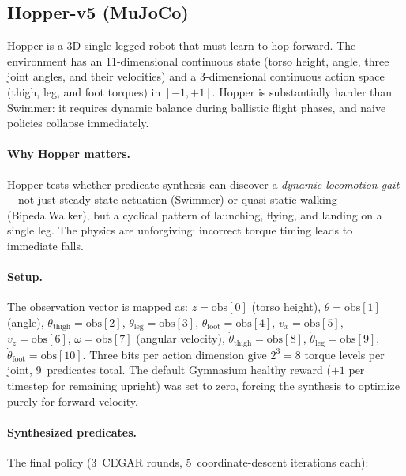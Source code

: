 \documentclass[9pt,a4paper]{article}
\theoremstyle{plain}
\theoremstyle{definition}
\theoremstyle{remark}
\begin{document}
\subsection{Hopper-v5 (MuJoCo)}

Hopper is a 3D single-legged robot that must learn to hop forward.
The environment has an 11-dimensional continuous state
(torso height, angle, three joint angles, and their velocities) and
a 3-dimensional continuous action space (thigh, leg, and foot torques)
in $[-1, +1]$.  Hopper is substantially harder than Swimmer: it
requires dynamic balance during ballistic flight phases, and naive
policies collapse immediately.

\paragraph{Why Hopper matters.}
Hopper tests whether predicate synthesis can discover a
\emph{dynamic locomotion gait}---not just steady-state actuation
(Swimmer) or quasi-static walking (BipedalWalker), but a cyclical
pattern of launching, flying, and landing on a single leg.
The physics are unforgiving: incorrect torque timing leads to
immediate falls.

\paragraph{Setup.}
The observation vector is mapped as:
$z = \text{obs}[0]$ (torso height),
$\theta = \text{obs}[1]$ (angle),
$\theta_{\text{thigh}} = \text{obs}[2]$,
$\theta_{\text{leg}} = \text{obs}[3]$,
$\theta_{\text{foot}} = \text{obs}[4]$,
$v_x = \text{obs}[5]$,
$v_z = \text{obs}[6]$,
$\omega = \text{obs}[7]$ (angular velocity),
$\dot\theta_{\text{thigh}} = \text{obs}[8]$,
$\dot\theta_{\text{leg}} = \text{obs}[9]$,
$\dot\theta_{\text{foot}} = \text{obs}[10]$.
Three bits per action dimension give $2^3 = 8$ torque levels per joint,
9~predicates total.  The default Gymnasium healthy reward ($+1$ per
timestep for remaining upright) was set to zero, forcing the synthesis
to optimize purely for forward velocity.

\paragraph{Synthesized predicates.}
The final policy (3~CEGAR rounds, 5~coordinate-descent iterations each):
\end{document}
